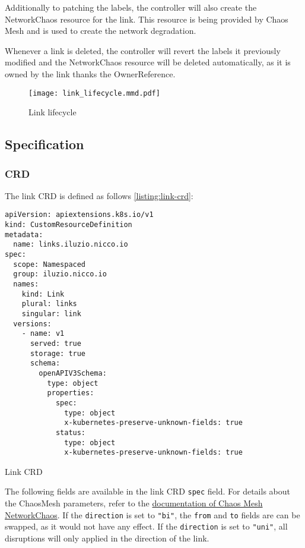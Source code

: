 Additionally to patching the labels, the controller will also create the NetworkChaos resource for the link. This resource is being provided by Chaos Mesh and is used to create the network degradation.

Whenever a link is deleted, the controller will revert the labels it previously modified and the NetworkChaos resource will be deleted automatically, as it is owned by the link thanks the OwnerReference.

\begin{figure}[H]
  \label{fig:link-lifecycle}
  \caption{Link lifecycle}
  \centering
  \texttt{[image: link\_lifecycle.mmd.pdf]}
\end{figure}

\subsection{Specification}

\subsubsection{CRD}

The link CRD is defined as follows \ref{listing:link-crd}:

\begin{listing}[H]
  \begin{verbatim}
apiVersion: apiextensions.k8s.io/v1
kind: CustomResourceDefinition
metadata:
  name: links.iluzio.nicco.io
spec:
  scope: Namespaced
  group: iluzio.nicco.io
  names:
    kind: Link
    plural: links
    singular: link
  versions:
    - name: v1
      served: true
      storage: true
      schema:
        openAPIV3Schema:
          type: object
          properties:
            spec:
              type: object
              x-kubernetes-preserve-unknown-fields: true
            status:
              type: object
              x-kubernetes-preserve-unknown-fields: true
  \end{verbatim}
  \caption{Link CRD}
  \label{listing:link-crd}
\end{listing}

The following fields are available in the link CRD \verb|spec| field.
For details about the ChaosMesh parameters, refer to the \href{https://chaos-mesh.org/docs/simulate-network-chaos-on-kubernetes/\#field-description}{documentation of Chaos Mesh NetworkChaos}.
If the \verb|direction| is set to \verb|"bi"|, the \verb|from| and \verb|to| fields are can be swapped, as it would not have any effect.
If the \verb|direction| is set to \verb|"uni"|, all disruptions will only applied in the direction of the link.

